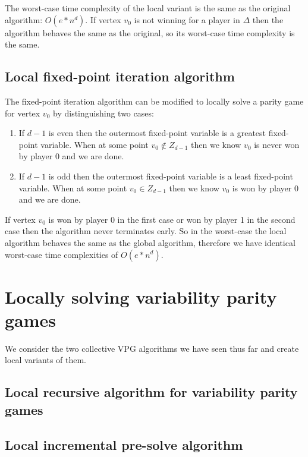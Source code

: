 The worst-case time complexity of the local variant is the same as the original algorithm: $O(e*n^d)$. If vertex $v_0$ is not winning for a player in $\Delta$ then the algorithm behaves the same as the original, so its worst-case time complexity is the same.


\subsection{Local fixed-point iteration algorithm}
The fixed-point iteration algorithm can be modified to locally solve a parity game for vertex $v_0$ by distinguishing two cases:
\begin{enumerate}
	\item If $d-1$ is even then the outermost fixed-point variable is a greatest fixed-point variable. When at some point $v_0 \notin Z_{d-1}$ then we know $v_0$ is never won by player $0$ and we are done.
	\item If $d-1$ is odd then the outermost fixed-point variable is a least fixed-point variable. When at some point $v_0 \in Z_{d-1}$ then we know $v_0$ is won by player $0$ and we are done.
\end{enumerate}

If vertex $v_0$ is won by player 0 in the first case or won by player 1 in the second case then the algorithm never terminates early. So in the worst-case the local algorithm behaves the same as the global algorithm, therefore we have identical worst-case time complexities of $O(e*n^d)$.

\section{Locally solving variability parity games}
We consider the two collective VPG algorithms we have seen thus far and create local variants of them.
\subsection{Local recursive algorithm for variability parity games}


\subsection{Local incremental pre-solve algorithm}

